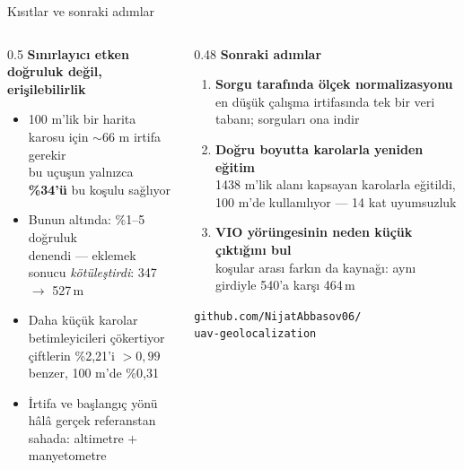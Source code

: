 \documentclass[aspectratio=169]{beamer}
\begin{document}
\begin{frame}{Kısıtlar ve sonraki adımlar}
\begin{columns}[T]
\begin{column}{0.5\textwidth}
\textbf{Sınırlayıcı etken doğruluk değil, erişilebilirlik}
\begin{itemize}
\item 100 m'lik bir harita karosu için $\sim$66 m irtifa gerekir\\
      {\small bu uçuşun yalnızca \textbf{\%34'ü} bu koşulu sağlıyor}
\item Bunun altında: \%1--5 doğruluk\\
      {\small denendi --- eklemek sonucu \emph{kötüleştirdi}: 347 $\rightarrow$ 527\,m}
\item Daha küçük karolar betimleyicileri çökertiyor\\
      {\small çiftlerin \%2,21'i $>0,99$ benzer, 100 m'de \%0,31}
\item İrtifa ve başlangıç yönü hâlâ gerçek referanstan\\
      {\small sahada: altimetre $+$ manyetometre}
\end{itemize}
\end{column}
\begin{column}{0.48\textwidth}
\textbf{Sonraki adımlar}
\begin{enumerate}
\item \textbf{Sorgu tarafında ölçek normalizasyonu}\\
      {\small en düşük çalışma irtifasında tek bir veri tabanı; sorguları ona indir}
\item \textbf{Doğru boyutta karolarla yeniden eğitim}\\
      {\small 1438 m'lik alanı kapsayan karolarla eğitildi, 100 m'de kullanılıyor
      --- 14 kat uyumsuzluk}
\item \textbf{VIO yörüngesinin neden küçük çıktığını bul}\\
      {\small koşular arası farkın da kaynağı: aynı girdiyle 540'a karşı 464\,m}
\end{enumerate}

\vspace{1.2em}
\centering
\footnotesize
\texttt{github.com/NijatAbbasov06/}\\
\texttt{uav-geolocalization}
\end{column}
\end{columns}
\end{frame}
\end{document}
